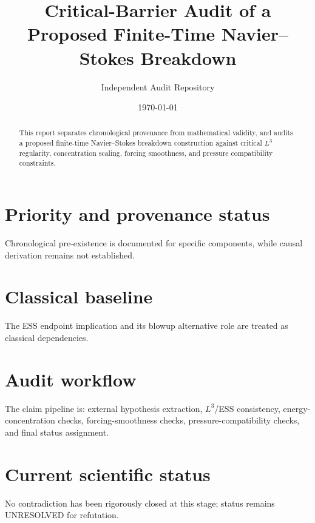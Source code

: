 \documentclass[11pt]{article}
\title{Critical-Barrier Audit of a Proposed Finite-Time Navier--Stokes Breakdown}
\author{Independent Audit Repository}
\date{\today}
\begin{document}
\maketitle

\begin{abstract}
This report separates chronological provenance from mathematical validity,
and audits a proposed finite-time Navier--Stokes breakdown construction
against critical $L^3$ regularity, concentration scaling, forcing smoothness,
and pressure compatibility constraints.
\end{abstract}

\section{Priority and provenance status}
Chronological pre-existence is documented for specific components, while
causal derivation remains not established.

\section{Classical baseline}
The ESS endpoint implication and its blowup alternative role are treated as
classical dependencies.

\section{Audit workflow}
The claim pipeline is: external hypothesis extraction, $L^3$/ESS consistency,
energy-concentration checks, forcing-smoothness checks, pressure-compatibility
checks, and final status assignment.

\section{Current scientific status}
No contradiction has been rigorously closed at this stage; status remains
UNRESOLVED for refutation.



\end{document}

